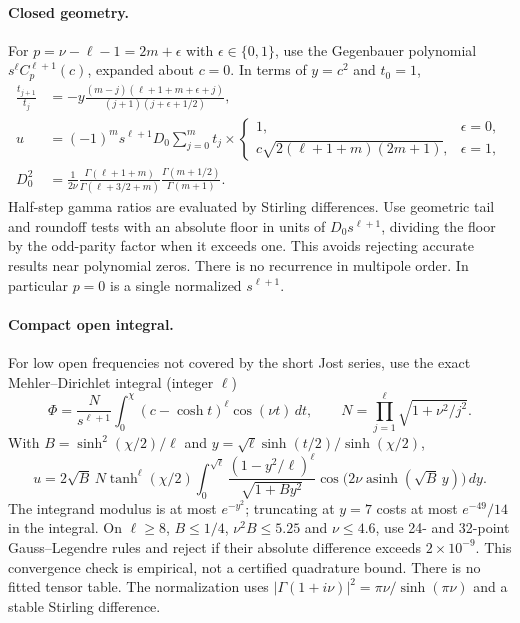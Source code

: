 \documentclass[10pt]{article}
\newcommand{\asinh}{\operatorname{asinh}}
\begin{document}
\paragraph{Closed geometry.}
For $p=\nu-\ell-1=2m+\epsilon$ with $\epsilon\in\{0,1\}$, use the
Gegenbauer polynomial $s^\ell C_p^{\ell+1}(c)$, expanded about $c=0$.
In terms of $y=c^2$ and $t_0=1$,
\begin{align}
 \frac{t_{j+1}}{t_j}&=-y\frac{(m-j)(\ell+1+m+\epsilon+j)}
 {(j+1)(j+\epsilon+1/2)},\\
 u&=(-1)^m s^{\ell+1}D_0\sum_{j=0}^m t_j\times
 \begin{cases}1,&\epsilon=0,\\ c\sqrt{2(\ell+1+m)(2m+1)},&\epsilon=1,\end{cases}\\
 D_0^2&=\frac{1}{2\nu}\frac{\Gamma(\ell+1+m)}{\Gamma(\ell+3/2+m)}
 \frac{\Gamma(m+1/2)}{\Gamma(m+1)}.
\end{align}
Half-step gamma ratios are evaluated by Stirling differences. Use geometric tail and roundoff tests with an absolute floor in units of
$D_0 s^{\ell+1}$, dividing the floor by the odd-parity factor when it exceeds one.
This avoids rejecting accurate results near polynomial zeros. There is no
recurrence in multipole order. In particular $p=0$ is a single normalized $s^{\ell+1}$.

\paragraph{Compact open integral.}
For low open frequencies not covered by the short Jost series, use the
exact Mehler--Dirichlet integral (integer $\ell$)
\begin{equation}
 \Phi=\frac{N}{s^{\ell+1}}\int_0^\chi(c-\cosh t)^\ell\cos(\nu t)\,dt,
 \qquad N=\prod_{j=1}^\ell\sqrt{1+\nu^2/j^2}.
\end{equation}
With $B=\sinh^2(\chi/2)/\ell$ and $y=\sqrt\ell\sinh(t/2)/\sinh(\chi/2)$,
\begin{equation}
 u=2\sqrt B\,N\tanh^\ell(\chi/2)
 \int_0^{\sqrt\ell}\frac{(1-y^2/\ell)^\ell}{\sqrt{1+By^2}}
 \cos\bigl(2\nu\asinh(\sqrt B\,y)\bigr)\,dy .\label{eq:compact}
\end{equation}
The integrand modulus is at most $e^{-y^2}$; truncating at $y=7$ costs
at most $e^{-49}/14$ in the integral. On $\ell\geq8$, $B\leq1/4$,
$\nu^2B\leq5.25$ and $\nu\leq4.6$, use 24- and 32-point Gauss--Legendre
rules and reject if their absolute difference exceeds $2\times10^{-9}$.
This convergence check is empirical, not a certified quadrature bound.
There is no fitted tensor table. The normalization uses
$|\Gamma(1+i\nu)|^2=\pi\nu/\sinh(\pi\nu)$ and a stable Stirling difference.
\end{document}
